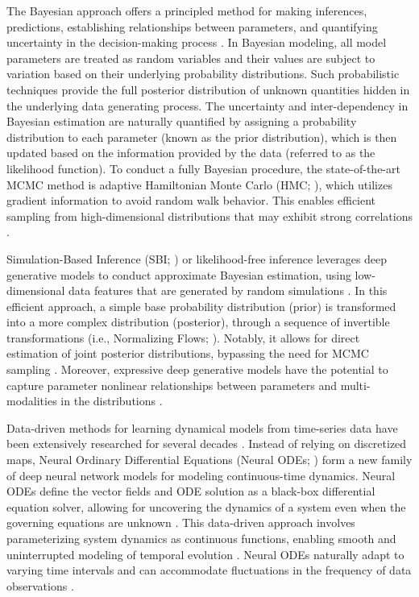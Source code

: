 \documentclass[preprint,11pt,authoryear]{elsarticle}
\begin{document}
The Bayesian approach offers a principled method for making inferences, predictions, establishing relationships between parameters, and quantifying uncertainty in the decision-making process \citep{BDA, Bishop, Gelman2020, VanSchoot2021}. In Bayesian modeling, all model parameters are treated as random variables and their values are subject to variation based on their underlying probability distributions. Such probabilistic techniques provide the full posterior distribution of unknown quantities hidden in the underlying data generating process. The uncertainty and inter-dependency in Bayesian estimation are naturally quantified by assigning a probability distribution to each parameter (known as the prior distribution), which is then updated based on the information provided by the data (referred to as the likelihood function). To conduct a fully Bayesian procedure, the state-of-the-art MCMC method is adaptive Hamiltonian Monte Carlo (HMC; \cite{Duane1987, Neal2010, Hoffman2014}), which utilizes gradient information to avoid random walk behavior.  This enables efficient sampling from high-dimensional distributions that may exhibit strong correlations \citep{Betancourt2017}.



Simulation-Based Inference (SBI; \cite{Cranmer2020, Brehmer2021}) or likelihood-free inference \citep{Papamakarios2016,  Brehmer2020} leverages deep generative models to conduct approximate Bayesian estimation, using low-dimensional data features that are generated by random simulations \citep{Goncalves2020, Lueckmann2021, Boelts2022}. In this efficient approach, a simple base probability distribution (prior) is transformed into a more complex distribution (posterior), through a sequence of invertible transformations (i.e., Normalizing Flows; \cite{Rezende2015, Papamakarios2019}). Notably, it allows for direct estimation of joint posterior distributions, bypassing the need for MCMC sampling \citep{Greenberg2019, Papamakarios2019b}. Moreover, expressive deep generative models have the potential to capture parameter nonlinear relationships between parameters and multi-modalities in the distributions \citep{Hashemi2023}.


Data-driven methods for learning dynamical models from time-series data have been extensively researched for several decades \citep{Juang1994, Ljung1998, Brunton2016, Linderman2017, Duncker2019, Koppe2019, Sip2023}.
Instead of relying on discretized maps, Neural Ordinary Differential Equations (Neural ODEs; \cite{Chen2018}) form a new family of deep neural network models for modeling continuous-time dynamics. Neural ODEs define the vector fields and ODE solution as a black-box differential equation solver, allowing for uncovering the dynamics of a system even when the governing equations are unknown \citep{Dupont2019, Bilovs2021}. This data-driven approach involves parameterizing system dynamics as continuous functions, enabling smooth and uninterrupted modeling of temporal evolution \citep{Yan2019, Kim2021}. Neural ODEs naturally adapt to varying time intervals and can accommodate fluctuations in the frequency of data observations \citep{Zhu2022, Goyal2023}.
\end{document}
